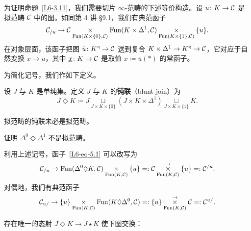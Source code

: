 \nitem\label{L6-5.1} 为证明命题~\ref{L6-3.11}，我们需要切片 $\infty$-范畴的下述等价构造。设 $u\colon K\to\mathcal{C}$ 是拟范畴 $\mathcal{C}$ 中的图。如同第 4 讲 §9.1，我们有典范函子
\begin{equation}\label{L6-eq-5.1}
\mathcal{C}_{/u}\to\mathcal{C}\underset{\operatorname{Fun}(K\times\{0\},\mathcal{C})}{\times}\operatorname{Fun}(K\times\Delta^1,\mathcal{C})\underset{\operatorname{Fun}(K\times\{1\},\mathcal{C})}{\times}\{u\}.
\end{equation}
在对象层面，该函子把图 $\bar u\colon K^{\triangleleft}\to\mathcal{C}$ 送到复合 $K\times\Delta^1\to K^{\triangleleft}\to\mathcal{C}$，它对应于自然变换 $\underline{x}\to u$，其中 $\underline{x}\colon K\to\mathcal{C}$ 是取值 $x\coloneqq\bar u(\ast)$ 的常函子。

为简化记号，我们作如下定义。

\begin{definition}\label{L6-5.2}
设 $J$ 与 $K$ 是单纯集。定义 $J$ 与 $K$ 的\textbf{钝联}（blunt join）为
\[
J\Diamond K\coloneqq J\underset{J\times K\times\{0\}}{\sqcup}(J\times K\times\Delta^1)\underset{J\times K\times\{1\}}{\sqcup}K.
\]
\end{definition}


\begin{warning}\label{L6-5.3}
拟范畴的钝联未必是拟范畴。
\end{warning}

\begin{exercise}\label{L6-5.4}
证明 $\Delta^0\Diamond\Delta^1$ 不是拟范畴。
\end{exercise}

\nitem\label{L6-5.5} 利用上述记号，函子~\eqref{L6-eq-5.1} 可以改写为
\begin{equation}\label{L6-eq-5.2}
\mathcal{C}_{/u}\to\operatorname{Fun}(\Delta^0\Diamond K,\mathcal{C})\underset{\operatorname{Fun}(K,\mathcal{C})}{\times}\{u\}=:\mathcal{C}\underset{\operatorname{Fun}(K,\mathcal{C})}{\overset{\to}{\times}}\{u\}=:\mathcal{C}^{/u}.
\end{equation}
对偶地，我们有典范函子
\begin{equation}\label{L6-eq-5.3}
\mathcal{C}_{u/}\to\{u\}\underset{\operatorname{Fun}(K,\mathcal{C})}{\times}\operatorname{Fun}(K\Diamond\Delta^0,\mathcal{C})=:\{u\}\underset{\operatorname{Fun}(K,\mathcal{C})}{\overset{\to}{\times}}\mathcal{C}=:\mathcal{C}^{u/}.
\end{equation}

\begin{exercise}\label{L6-5.6}
存在唯一的态射 $J\Diamond K\to J\star K$ 使下图交换：
\begin{center}
\end{center}
\end{exercise}

